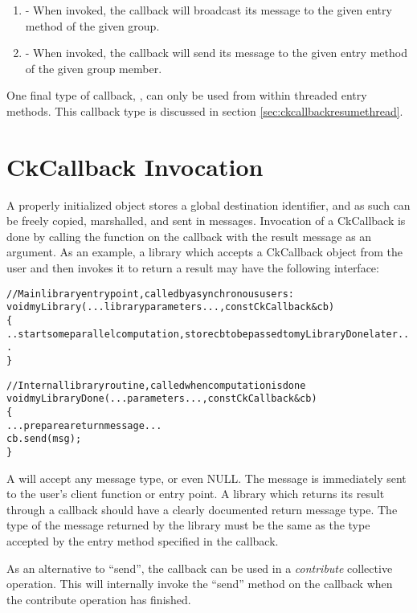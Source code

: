 \begin{enumerate}
\item {} - 
When invoked,
the callback will broadcast its message to the given entry method
of the given group.

\item {} - 
When invoked, the callback will send its message to the given entry
method of the given group member.

\end{enumerate}

One final type of callback, , can only be
used from within threaded entry methods.  This callback type is
discussed in section \ref{sec:ckcallbackresumethread}.

\section{CkCallback Invocation}

\label{libraryInterface}

A properly initialized  object stores a global
destination identifier, and as such can be freely copied, marshalled,
and sent in messages. Invocation of a CkCallback is done by calling
the function  on the callback with the result message as an
argument. As an example, a library which accepts a CkCallback object
from the user and then invokes it to return a result may have the
following interface:

\begin{alltt}
//Main library entry point, called by asynchronous users:
void myLibrary(...library parameters...,const CkCallback \&cb) 
\{
  ..start some parallel computation, store cb to be passed to myLibraryDone later...
\}

//Internal library routine, called when computation is done
void myLibraryDone(...parameters...,const CkCallback \&cb)
\{
  ...prepare a return message...
  cb.send(msg);
\}
\end{alltt}

A  will accept any message type, or even NULL.  The
message is immediately sent to the user's client function or entry
point.  A library which returns its result through a callback should
have a clearly documented return message type. The type of the message
returned by the library must be the same as the type accepted by the
entry method specified in the callback. 

As an alternative to ``send'', the callback can be used in a {\em
  contribute} collective operation. This will internally invoke the
``send'' method on the callback when the contribute operation has
finished.

